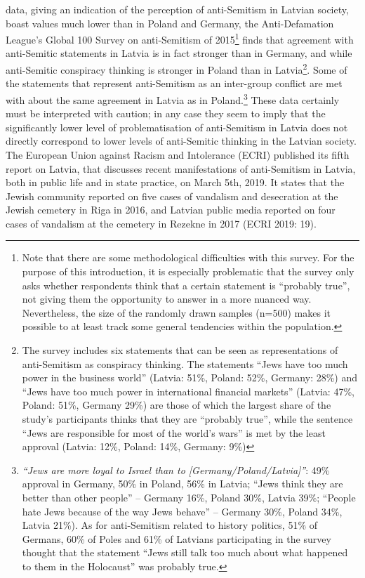 data, giving an indication of the perception of anti-Semitism in Latvian society, boast values much lower than in Poland and Germany, the Anti-Defamation League’s Global 100 Survey on anti-Semitism of 2015\footnote{Note that there are some methodological difficulties with this survey. For the purpose of this introduction, it is especially problematic that the survey only asks whether respondents think that a certain statement is ``probably true'', not giving them the opportunity to answer in a more nuanced way. Nevertheless, the size of the randomly drawn samples (n=500) makes it possible to at least track some general tendencies within the population.} finds that agreement with anti-Semitic statements in Latvia is in fact stronger than in Germany, and while anti-Semitic conspiracy thinking is stronger in Poland than in Latvia\footnote{The survey includes six statements that can be seen as representations of anti-Semitism as conspiracy thinking. The statements ``Jews have too much power in the business world'' (Latvia: 51\%, Poland: 52\%, Germany: 28\%) and ``Jews have too much power in international financial markets'' (Latvia: 47\%, Poland: 51\%, Germany 29\%) are those of which the largest share of the study’s participants thinks that they are ``probably true'', while the sentence ``Jews are responsible for most of the world's wars'' is met by the least approval (Latvia: 12\%, Poland: 14\%, Germany: 9\%)}. Some of the statements that represent anti-Semitism as an inter-group conflict are met with about the same agreement in Latvia as in Poland.\footnote{\textit{``Jews are more loyal to Israel than to [Germany/Poland/Latvia]''}: 49\% approval in Germany, 50\% in Poland, 56\% in Latvia; ``Jews think they are better than other people'' – Germany 16\%, Poland 30\%, Latvia 39\%; ``People hate Jews because of the way Jews behave'' – Germany 30\%, Poland 34\%, Latvia 21\%). As for anti-Semitism related to history politics, 51\% of Germans, 60\% of Poles and 61\% of Latvians participating in the survey thought that the statement ``Jews still talk too much about what happened to them in the Holocaust'' was probably true.}  These data certainly must be interpreted with caution; in any case they seem to imply that the significantly lower level of problematisation of anti-Semitism in Latvia does not directly correspond to lower levels of anti-Semitic thinking in the Latvian society.  \\
The European Union against Racism and Intolerance (ECRI) published its fifth report on Latvia, that discusses recent manifestations of anti-Semitism in Latvia, both in public life and in state practice, on March 5th, 2019. It states that the Jewish community reported on five cases of vandalism and desecration at the Jewish cemetery in Riga in 2016, and Latvian public media reported on four cases of vandalism at the cemetery in Rezekne in 2017 (ECRI 2019: 19). \\
